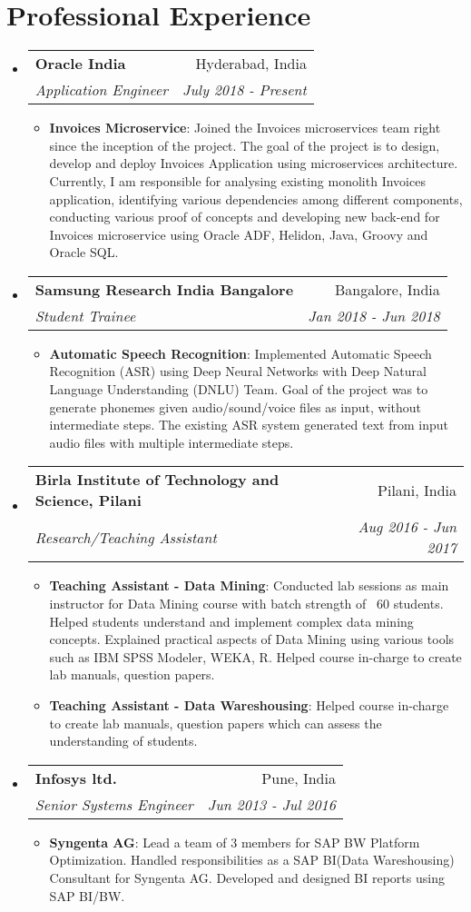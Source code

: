 \documentclass[letterpaper,11pt]{article}
\makeatletter
\newcommand{\resumeItem}[2]{
  \item\small{
    \textbf{#1}{: #2 \vspace{-2pt}}
  }
}
\newcommand{\resumeSubheading}[4]{
  \vspace{-1pt}\item
    \begin{tabular*}{0.97\textwidth}[t]{l@{\extracolsep{\fill}}r}
      \textbf{#1} & #2 \\
      \textit{\small#3} & \textit{\small #4} \\
    \end{tabular*}\vspace{-5pt}
}
\newcommand{\resumeSubHeadingListStart}{\begin{itemize}[leftmargin=*]}
\newcommand{\resumeSubHeadingListEnd}{\end{itemize}}
\newcommand{\resumeItemListStart}{\begin{itemize}}
\newcommand{\resumeItemListEnd}{\end{itemize}\vspace{-5pt}}
\makeatother
\begin{document}
\section{Professional Experience}
  \resumeSubHeadingListStart
    \resumeSubheading
      {Oracle India}{Hyderabad, India}
      {Application Engineer}{July 2018 - Present}
      \resumeItemListStart
        \resumeItem{Invoices Microservice}
      { Joined the Invoices microservices team right      since the inception of the project. The goal of   the project is to design,         develop and     deploy Invoices Application using microservices   architecture.
        Currently, I am responsible for analysing existing monolith Invoices application, identifying various dependencies among different components, conducting various proof of concepts and developing new back-end for Invoices microservice using Oracle ADF, Helidon, Java, Groovy and Oracle SQL.}
      \resumeItemListEnd
    \resumeSubheading
      {Samsung Research India Bangalore}{Bangalore, India}
      {Student Trainee}{Jan 2018 - Jun 2018}
      \resumeItemListStart
        \resumeItem{Automatic Speech Recognition}
          {Implemented Automatic Speech Recognition (ASR) using Deep Neural Networks with Deep Natural     Language Understanding (DNLU) Team. Goal of the project was to generate phonemes given audio/sound/voice files as input, without intermediate steps. The existing   ASR system generated text from input audio files with multiple intermediate steps.}
      \resumeItemListEnd
    \resumeSubheading
      {Birla Institute of Technology and Science, Pilani}{Pilani, India}
      {Research/Teaching Assistant}{Aug 2016 - Jun 2017}
      \resumeItemListStart
        \resumeItem{Teaching Assistant - Data Mining}
          {Conducted lab sessions as main instructor for Data Mining course with batch      strength of ~60 students. Helped students understand and implement complex      data mining concepts. Explained practical aspects of Data Mining using various tools such as IBM SPSS     Modeler, WEKA, R.
            Helped course in-charge to create lab manuals, question papers.}
        \resumeItem{Teaching Assistant - Data Wareshousing}
          {Helped course in-charge to  create lab manuals, question papers which can assess the understanding of students.}
      \resumeItemListEnd
    \resumeSubheading
      {Infosys ltd.}{Pune, India}
      {Senior Systems Engineer}{Jun 2013 - Jul 2016}
      \resumeItemListStart
        \resumeItem{Syngenta AG}
          {Lead a team of 3 members for SAP BW Platform Optimization.
          Handled responsibilities as a SAP BI(Data Wareshousing) Consultant for Syngenta AG.
            Developed and designed BI reports using SAP BI/BW.
            }
      \resumeItemListEnd
  \resumeSubHeadingListEnd
\end{document}
